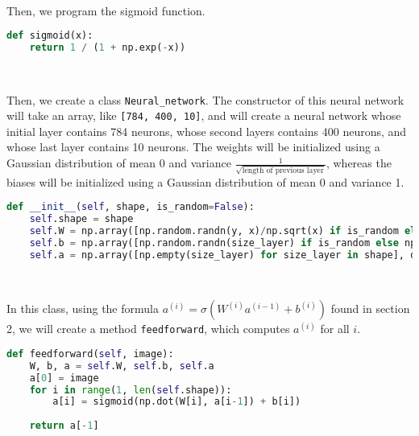 \documentclass{article}
\theoremstyle{definition}
\theoremstyle{remark}
\theoremstyle{example}
\begin{document}
~

Then, we program the sigmoid function.
\begin{lstlisting}[language=Python]
def sigmoid(x):
	return 1 / (1 + np.exp(-x))
\end{lstlisting}

~

Then, we create a class \texttt{Neural\_network}. The constructor of this neural network will take an array, like \texttt{[784, 400, 10]}, and will create a neural network whose initial layer contains 784 neurons, whose second layers contains 400 neurons, and whose last layer contains 10 neurons. The weights will be initialized using a Gaussian distribution of mean 0 and variance $\frac{1}{\sqrt{\text{length of previous layer}}}$, whereas the biases will be initialized using a Gaussian distribution of mean 0 and variance 1.
\begin{lstlisting}[language=Python]
def __init__(self, shape, is_random=False):
	self.shape = shape
	self.W = np.array([np.random.randn(y, x)/np.sqrt(x) if is_random else np.empty([y, x]) for x, y in zip([0] + shape[:-1], [0] + shape[1:])], dtype=object)
	self.b = np.array([np.random.randn(size_layer) if is_random else np.empty(size_layer) for size_layer in [0] + shape[1:]], dtype=object)
	self.a = np.array([np.empty(size_layer) for size_layer in shape], dtype=object)
\end{lstlisting}

~

In this class, using the formula $a^{(i)} = \sigma(W^{(i)}a^{(i-1)} + b^{(i)})$ found in section 2, we will create a method \texttt{feedforward}, which computes $a^{(i)}$ for all $i$.

\begin{lstlisting}[language=Python]
def feedforward(self, image):
	W, b, a = self.W, self.b, self.a
	a[0] = image
	for i in range(1, len(self.shape)):
		a[i] = sigmoid(np.dot(W[i], a[i-1]) + b[i])
			
	return a[-1]
\end{lstlisting}
\end{document}
